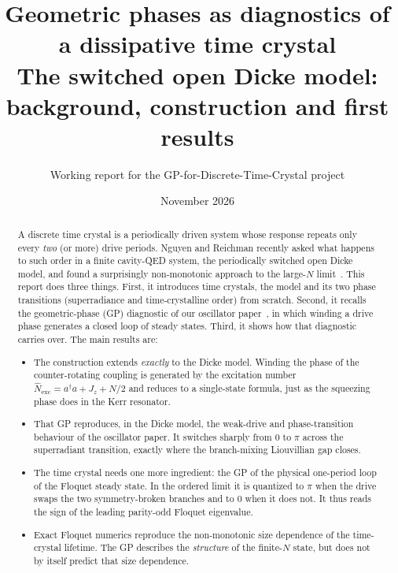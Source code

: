 \documentclass[11pt,a4paper]{article}
\title{\textbf{Geometric phases as diagnostics of a dissipative time crystal}\\[4pt]
\large The switched open Dicke model: background, construction and first results}
\author{Working report for the GP-for-Discrete-Time-Crystal project}
\date{November 2026}
\newcommand{\Nex}{\hat N_{\mathrm{exc}}}
\newcommand{\ad}{a^\dagger}
\begin{document}
\maketitle

\begin{abstract}
\noindent
A discrete time crystal is a periodically driven system whose response repeats only every
\emph{two} (or more) drive periods. Nguyen and Reichman recently asked what happens to such
order in a finite cavity-QED system, the periodically switched open Dicke model, and found
a surprisingly non-monotonic approach to the large-$N$ limit~\cite{nguyen2026}. This report
does three things. First, it introduces time crystals, the model and its two phase
transitions (superradiance and time-crystalline order) from scratch. Second, it recalls the
geometric-phase (GP) diagnostic of our oscillator paper~\cite{sun_gp}, in which winding a
drive phase generates a closed loop of steady states. Third, it shows how that diagnostic
carries over. The main results are:
\begin{itemize}[leftmargin=1.2em]
\item The construction extends \emph{exactly} to the Dicke model. Winding the phase of the
  counter-rotating coupling is generated by the excitation number $\Nex=\ad a+J_z+N/2$ and
  reduces to a single-state formula, just as the squeezing phase does in the Kerr resonator.
\item That GP reproduces, in the Dicke model, the weak-drive and phase-transition behaviour of
  the oscillator paper. It switches sharply from $0$ to $\pi$ across the superradiant
  transition, exactly where the branch-mixing Liouvillian gap closes.
\item The time crystal needs one more ingredient: the GP of the physical one-period loop of the
  Floquet steady state. In the ordered limit it is quantized to $\pi$ when the drive swaps the
  two symmetry-broken branches and to $0$ when it does not. It thus reads the sign of the
  leading parity-odd Floquet eigenvalue.
\item Exact Floquet numerics reproduce the non-monotonic size dependence of the time-crystal
  lifetime. The GP describes the \emph{structure} of the finite-$N$ state, but does not by
  itself predict that size dependence.
\end{itemize}
\end{abstract}

\setcounter{tocdepth}{1}
\tableofcontents
\clearpage

\end{document}
